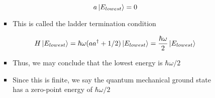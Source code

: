 \begin{itemize}
\begin{itemize}
\begin{itemize}
\begin{itemize}
                $$a\ket{E_{lowest}}=0$$

              \item This is called the ladder termination condition

                $$H\ket{E_{lowest}}=\hbar\omega(aa^{\dagger}+1/2)\ket{E_{lowest}}=\frac{\hbar\omega}{2}\ket{E_{lowest}}$$

              \item Thus, we may conclude that the lowest energy is $\hbar\omega/2$

              \item Since this is finite, we say the quantum mechanical ground state has a zero-point energy of $\hbar\omega/2$

            \end{itemize}

        \end{itemize}

    \end{itemize}

\end{itemize}



